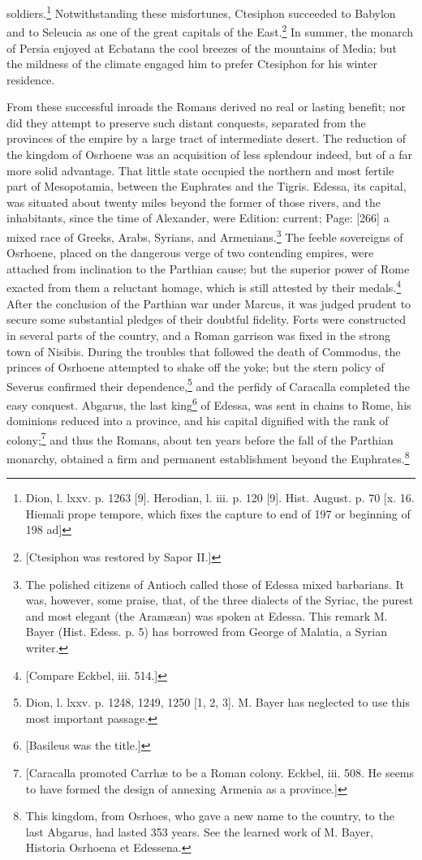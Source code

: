 soldiers.\footnote{Dion, l. lxxv. p. 1263 [9]. Herodian, l. iii. p. 120 [9]. Hist. August. p. 70 [x. 16. Hiemali prope tempore, which fixes the capture to end of 197 or beginning of 198 ad]} Notwithstanding these misfortunes, Ctesiphon succeeded to Babylon and to Seleucia as one of the great capitals of the East.\footnote{[Ctesiphon was restored by Sapor II.]} In summer, the monarch of Persia enjoyed at Ecbatana the cool breezes of the mountains of Media; but the mildness of the climate engaged him to prefer Ctesiphon for his winter residence.

From these successful inroads the Romans derived no real or lasting benefit; nor did they attempt to preserve such distant conquests, separated from the provinces of the empire by a large tract of intermediate desert. The reduction of the kingdom of Osrhoene was an acquisition of less splendour indeed, but of a far more solid advantage. That little state occupied the northern and most fertile part of Mesopotamia, between the Euphrates and the Tigris. Edessa, its capital, was situated about twenty miles beyond the former of those rivers, and the inhabitants, since the time of Alexander, were Edition: current; Page: [266] a mixed race of Greeks, Arabs, Syrians, and Armenians.\footnote{The polished citizens of Antioch called those of Edessa mixed barbarians. It was, however, some praise, that, of the three dialects of the Syriac, the purest and most elegant (the Aramæan) was spoken at Edessa. This remark M. Bayer (Hist. Edess. p. 5) has borrowed from George of Malatia, a Syrian writer.} The feeble sovereigns of Osrhoene, placed on the dangerous verge of two contending empires, were attached from inclination to the Parthian cause; but the superior power of Rome exacted from them a reluctant homage, which is still attested by their medals.\footnote{[Compare Eckbel, iii. 514.]} After the conclusion of the Parthian war under Marcus, it was judged prudent to secure some substantial pledges of their doubtful fidelity. Forts were constructed in several parts of the country, and a Roman garrison was fixed in the strong town of Nisibis. During the troubles that followed the death of Commodus, the princes of Osrhoene attempted to shake off the yoke; but the stern policy of Severus confirmed their dependence,\footnote{Dion, l. lxxv. p. 1248, 1249, 1250 [1, 2, 3]. M. Bayer has neglected to use this most important passage.} and the perfidy of Caracalla completed the easy conquest. Abgarus, the last king\footnote{[Basileus was the title.]} of Edessa, was sent in chains to Rome, his dominions reduced into a province, and his capital dignified with the rank of colony;\footnote{[Caracalla promoted Carrhæ to be a Roman colony. Eckbel, iii. 508. He seems to have formed the design of annexing Armenia as a province.]} and thus the Romans, about ten years before the fall of the Parthian monarchy, obtained a firm and permanent establishment beyond the Euphrates.\footnote{This kingdom, from Osrhoes, who gave a new name to the country, to the last Abgarus, had lasted 353 years. See the learned work of M. Bayer, Historia Osrhoena et Edessena.}

